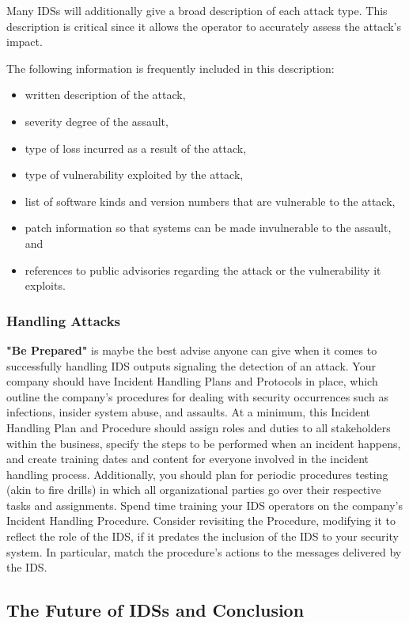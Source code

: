 \documentclass[12pt]{article}
\begin{document}
    \par Many IDSs will additionally give a broad description of each attack type. This description is critical since it allows the operator to accurately assess the attack's impact.
    \par The following information is frequently included in this description:
    
    \begin{itemize}
        \item written description of the attack,
        \item severity degree of the assault,
        \item type of loss incurred as a result of the attack,
        \item type of vulnerability exploited by the attack,
        \item list of software kinds and version numbers that are vulnerable to the attack,
        \item patch information so that systems can be made invulnerable to the assault, and
        \item references to public advisories regarding the attack or the vulnerability it exploits.
    \end{itemize}
    
    \subsubsection{Handling Attacks}
    \par \textbf{"Be Prepared"} is maybe the best advise anyone can give when it comes to successfully handling IDS outputs signaling the detection of an attack. Your company should have Incident Handling Plans and Protocols in place, which outline the company's procedures for dealing with security occurrences such as infections, insider system abuse, and assaults. At a minimum, this Incident Handling Plan and Procedure should assign roles and duties to all stakeholders within the business, specify the steps to be performed when an incident happens, and create training dates and content for everyone involved in the incident handling process. Additionally, you should plan for periodic procedures testing (akin to fire drills) in which all organizational parties go over their respective tasks and assignments. Spend time training your IDS operators on the company's Incident Handling Procedure. Consider revisiting the Procedure, modifying it to reflect the role of the IDS, if it predates the inclusion of the IDS to your security system. In particular, match the procedure's actions to the messages delivered by the IDS.
    \cleardoublepage
    \begin{center}
        \huge{\section{The Future of IDSs and Conclusion}\label{sec:intro}}
    \end{center}
    
\end{document}
